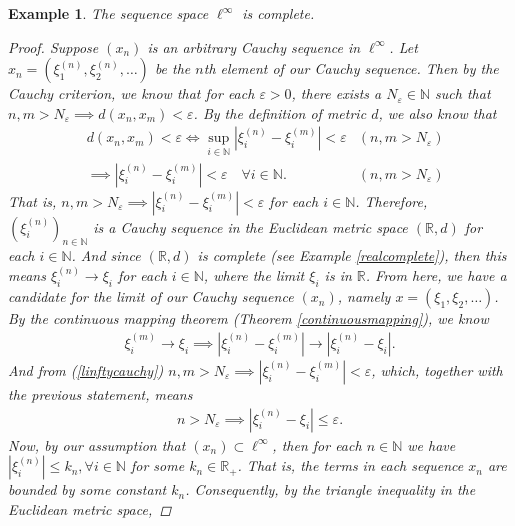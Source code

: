 \documentclass[11pt]{article}
\theoremstyle{mystyle}
\newtheorem{protoexamp}{Example}[section]
\newenvironment{examp}
{\colorlet{shadecolor}{orange!15}\begin{shaded}\begin{protoexamp}}
{\end{protoexamp}\end{shaded}}
\begin{document}
\begin{examp}
The sequence space $\ell^{\infty}$ is complete.
\begin{proof}
Suppose $(x_n)$ is an arbitrary Cauchy sequence in $\ell^{\infty}$. Let $x_n = (\xi_1^{(n)}, \xi_2^{(n)}, \ldots )$ be the $n$th element of our Cauchy sequence. Then by the Cauchy criterion, we know that for each $\varepsilon > 0$, there exists a $N_{\varepsilon} \in \mathbb{N}$ such that $n, m > N_{\varepsilon} \implies d(x_n, x_m) < \varepsilon$. By the definition of metric $d$, we also know that
\begin{align}
    &d(x_n, x_m) < \varepsilon \iff \sup_{i \in \mathbb{N}} | \xi_i^{(n)} - \xi_i^{(m)}| < \varepsilon & (n, m > N_{\varepsilon})\nonumber\\
    &\implies | \xi_i^{(n)} - \xi_i^{(m)}| < \varepsilon \quad \text{$\forall i \in \mathbb{N}$}. & (n, m > N_{\varepsilon})\label{linftycauchy}
\end{align}
That is, $n, m > N_{\varepsilon} \implies | \xi_i^{(n)} - \xi_i^{(m)}| < \varepsilon$ for each $i \in \mathbb{N}$. Therefore, $\left(\xi_i^{(n)} \right)_{n \in \mathbb{N}}$ is a Cauchy sequence in the Euclidean metric space $(\mathbb{R}, d)$ for each $i \in \mathbb{N}$. And since $(\mathbb{R}, d)$ is complete (see Example \ref{realcomplete}), then this means $\xi_i^{(n)} \longrightarrow \xi_i$ for each $i \in \mathbb{N}$, where the limit $\xi_i$ is in $\mathbb{R}$.\newline
From here, we have a candidate for the limit of our Cauchy sequence $(x_n)$, namely $x = (\xi_1, \xi_2, \ldots)$. By the continuous mapping theorem (Theorem \ref{continuousmapping}), we know 
\begin{align*}
    \xi_i^{(m)} \longrightarrow \xi_i \implies  | \xi_i^{(n)} - \xi_i^{(m)}| \longrightarrow | \xi_i^{(n)} - \xi_i|.
\end{align*} 
And from (\ref{linftycauchy}) $n, m > N_{\varepsilon} \implies | \xi_i^{(n)} - \xi_i^{(m)}| < \varepsilon$, which, together with the previous statement, means 
\begin{align}
     n  > N_{\varepsilon} \implies |\xi_i^{(n)} - \xi_i| \leq \varepsilon. \label{linftybound}
\end{align}
Now, by our assumption that $(x_n) \subset \ell^{\infty}$, then for each $n \in \mathbb{N}$ we have $|\xi_i^{(n)}| \leq k_n, \forall i \in \mathbb{N}$ for some $k_n \in \mathbb{R}_+$. That is, the terms in each sequence $x_n$ are bounded by some constant $k_n$. Consequently, by the triangle inequality in the Euclidean metric space,

\end{proof}
\end{examp}
\end{document}
